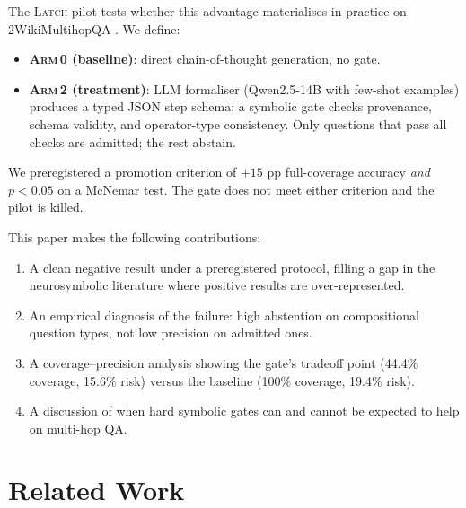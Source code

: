 \documentclass[11pt]{article}
\newcommand{\armi}{\textsc{Arm\,0}}
\newcommand{\armii}{\textsc{Arm\,2}}
\newcommand{\latch}{\textsc{Latch}}
\newcommand{\mcnem}{McNemar}
\begin{document}
The \latch{} pilot tests whether this advantage materialises in practice on
2WikiMultihopQA \citep{2wikimultihopqa}.  We define:

\begin{itemize}[leftmargin=*,noitemsep]
  \item \textbf{\armi{} (baseline)}: direct chain-of-thought generation,
        no gate.
  \item \textbf{\armii{} (treatment)}: LLM formaliser (Qwen2.5-14B with
        few-shot examples) produces a typed JSON step schema; a symbolic gate
        checks provenance, schema validity, and operator-type consistency.
        Only questions that pass all checks are admitted; the rest abstain.
\end{itemize}

We preregistered a promotion criterion of $+15$ pp full-coverage accuracy
\emph{and} $p < 0.05$ on a \mcnem{} test.  The gate does not meet either
criterion and the pilot is killed.

This paper makes the following contributions:
\begin{enumerate}[leftmargin=*,noitemsep]
  \item A clean negative result under a preregistered protocol, filling a
        gap in the neurosymbolic literature where positive results are
        over-represented.
  \item An empirical diagnosis of the failure: high abstention on
        compositional question types, not low precision on admitted ones.
  \item A coverage--precision analysis showing the gate's tradeoff point
        (44.4\% coverage, 15.6\% risk) versus the baseline (100\% coverage,
        19.4\% risk).
  \item A discussion of when hard symbolic gates can and cannot be
        expected to help on multi-hop QA.
\end{enumerate}

\section{Related Work}
\label{sec:related}
\end{document}

